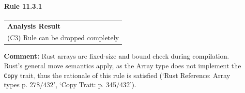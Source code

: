 \paragraph{Rule 11.3.1}
\begin{longtable}{p{13cm}}
\textbf{Analysis Result} \\
(C3) Rule can be dropped completely \\
\end{longtable}
\textbf{Comment:} Rust arrays are fixed-size and bound check during compilation. Rust's general move semantics apply, as the Array type does not implement the \texttt{Copy} trait, thus the rationale of this rule is satisfied (`Rust Reference: Array types p. 278/432', `Copy Trait: p. 345/432'). \\
